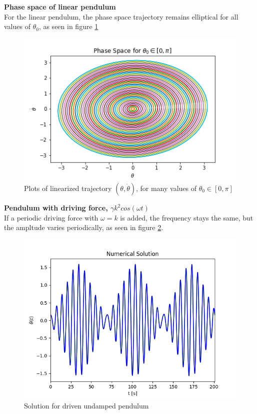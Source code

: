 \documentclass[12pt]{article}
\newenvironment{problem}[2][]{\begin{trivlist}
\item[\hskip \labelsep {\bfseries #1}\hskip \labelsep {\bfseries #2.}]}{\end{trivlist}}
\begin{document}
\begin{problem}{2}
	\textbf{Phase space of linear pendulum} \\
	For the linear pendulum, the phase space trajectory remains elliptical for all values of $\theta_{0}$, as seen in figure \ref{phaseLin}

\begin{figure}[h!]
\centering
  \includegraphics[scale=0.6]{../figures/phaseSpaceLinear.png}
  \caption{Plots of linearized trajectory $(\theta,\dot{\theta})$, for many values of $\theta_{0} \in [0,\pi]$}
  \label{phaseLin}
\end{figure}
\end{problem}

\begin{problem}{3}
	\textbf{Pendulum with driving force, $\gamma k^{2}cos(\omega t)$} \\
	If a periodic driving force with $\omega = k$ is added, the frequency stays the same, but the ampltude varies periodically, as seen in figure \ref{driving}. 
\begin{figure}[h!]
	\centering
  	\includegraphics[scale=0.6]{../figures/drivingForce.png}
 	\caption{Solution for driven undamped pendulum}
  	\label{driving}
\end{figure}
\end{problem}
\end{document}
